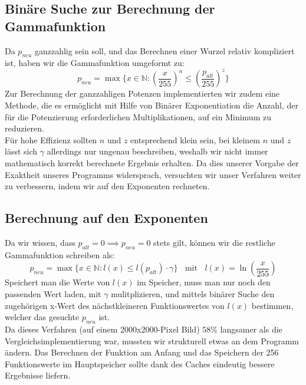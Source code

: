 \documentclass[course=erap]{aspdoc}
\begin{document}
	\subsection{Binäre Suche zur Berechnung der Gammafunktion}
	Da $p_{neu}$ ganzzahlig sein soll, und das Berechnen einer Wurzel relativ kompliziert ist, haben wir die Gammafunktion umgeformt zu:
	\begin{equation}
	\label{(5)}
	p_{neu} = \max \{ x \in \mathbb{N} :\left(\frac{x}{255}\right)^{n} \leq\left(\frac{p_{alt}}{255}\right)^{z} \}
	\end{equation}
	\noindent	
	Zur Berechnung der ganzzahligen Potenzen implementierten wir zudem eine Methode, die es ermöglicht mit Hilfe von Binärer Exponentiation die Anzahl, der für die Potenzierung erforderlichen Multiplikationen, auf ein Minimum zu reduzieren.\\
	
	\noindent		 
	Für hohe Effizienz sollten $n$ und $z$ entsprechend klein sein, bei kleinem $n$ und $z$ lässt sich $\gamma$ allerdings nur ungenau beschreiben, weshalb wir nicht immer mathematisch korrekt berechnete Ergebnis erhalten. Da dies unserer Vorgabe der Exaktheit unseres Programms widersprach, versuchten wir unser Verfahren weiter zu verbessern, indem wir auf den Exponenten rechneten.          
	
	\subsection{Berechnung auf den Exponenten}
	Da wir wissen, dass $p_{alt}=0 \implies p_{neu}=0$ stets gilt, können wir die restliche Gammafunktion schreiben als:
	\begin{equation}
	\label{(6)}
	    p_{neu} = \max\{x\in \mathbb{N} : l(x) \leq l(p_{alt}) \cdot \gamma\} \;\;\text{ mit } \;\; l(x) = \ln\left(\frac{x}{255}\right)
	\end{equation}
	Speichert man die Werte von $l(x)$ im Speicher, muss man nur noch den passenden Wert laden, mit $\gamma$ mulitplizieren, und mittels binärer Suche den zugehörigen x-Wert des nächstkleineren Funktionswertes von $l(x)$ bestimmen, welcher das gesuchte $p_{neu}$ ist.\\
	
	\noindent
	Da dieses Verfahren (auf einem 2000x2000-Pixel Bild) $58\%$ langsamer als die Vergleichsimplementierung war, mussten wir strukturell etwas an dem Programm ändern. Das Berechnen der Funktion am Anfang und das Speichern der 256 Funktionswerte im Hauptspeicher sollte dank des Caches eindeutig bessere Ergebnisse liefern.\\
	
\end{document}
